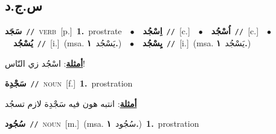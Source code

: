 \documentclass[10pt,a4paper,twoside]{article} %
\begin{document}
\begin{multicols}{2}
\vspace{-3mm}
\subsection*{\color{blue}\foreignlanguage{arabic}{س.ج.د}\color{blue}{}} 

{\setlength\topsep{0pt}\textbf{\foreignlanguage{arabic}{سَجَد}}\ {\color{gray}\texttt{//}\color{black}}\ \textsc{verb}\ [p.]\ \textbf{1.}~prostrate\ \ $\bullet$\ \ \setlength\topsep{0pt}\textbf{\foreignlanguage{arabic}{اِسْجُد}}\ {\color{gray}\texttt{//}\color{black}}\ [c.]\ \ $\bullet$\ \ \setlength\topsep{0pt}\textbf{\foreignlanguage{arabic}{اُسْجُد}}\ {\color{gray}\texttt{//}\color{black}}\ [c.]\ \ $\bullet$\ \ \setlength\topsep{0pt}\textbf{\foreignlanguage{arabic}{يُسْجُد}}\ {\color{gray}\texttt{//}\color{black}}\ [i.]\ \color{gray}(msa. \foreignlanguage{arabic}{يَسْجُد}~\foreignlanguage{arabic}{\textbf{١.}})\color{black}\ \ $\bullet$\ \ \setlength\topsep{0pt}\textbf{\foreignlanguage{arabic}{يِسْجُد}}\ {\color{gray}\texttt{//}\color{black}}\ [i.]\ \color{gray}(msa. \foreignlanguage{arabic}{يَسْجُد}~\foreignlanguage{arabic}{\textbf{١.}})\color{black}\  \begin{flushright}\color{gray}\foreignlanguage{arabic}{\textbf{\underline{\foreignlanguage{arabic}{أمثلة}}}: اسْجُد زي النّاس!}\end{flushright}\color{black}} \vspace{2mm}

{\setlength\topsep{0pt}\textbf{\foreignlanguage{arabic}{سَجْدِة}}\ {\color{gray}\texttt{//}\color{black}}\ \textsc{noun}\ [f.]\ \textbf{1.}~prostration\  \begin{flushright}\color{gray}\foreignlanguage{arabic}{\textbf{\underline{\foreignlanguage{arabic}{أمثلة}}}: انتبه هون فيه سَجْدِة لازم تسجُد}\end{flushright}\color{black}} \vspace{2mm}

{\setlength\topsep{0pt}\textbf{\foreignlanguage{arabic}{سُجُود}}\ {\color{gray}\texttt{//}\color{black}}\ \textsc{noun}\ [m.]\ \color{gray}(msa. \foreignlanguage{arabic}{سُجُود}~\foreignlanguage{arabic}{\textbf{١.}})\color{black}\ \textbf{1.}~prostration\ } \vspace{2mm}


\end{multicols}
\end{document}
